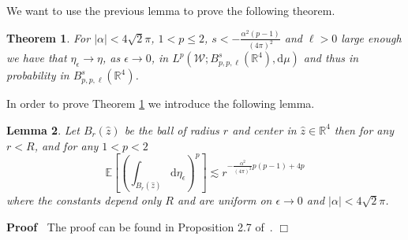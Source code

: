 \documentclass[a4paper,10pt]{article}
\newcommand{\mathd}{\mathrm{d}}
\newenvironment{proof}{\noindent\textbf{Proof\ }}{\hspace*{\fill}$\Box$\medskip}
\newtheorem{theorem}{Theorem}
\newtheorem{lemma}[theorem]{Lemma}
\begin{document}
We want to use the previous lemma to prove the following theorem.

\begin{theorem}
  \label{theorem_Lp}For $| \alpha | < 4 \sqrt{2} \pi$, $1 < p \leqslant 2$, $s
  < - \frac{\alpha^2 (p - 1)}{(4 \pi)^2}$ and $\ell > 0$ large enough we have
  that $\eta_{\epsilon} \rightarrow \eta$, as $\epsilon \rightarrow 0$, in
  $L^p (\mathcal{W} ; B^s_{p, p, \ell} (\mathbb{R}^4), \mathd \mu)$ and thus
  in probability in $B^s_{p, p, \ell} (\mathbb{R}^4)$.
\end{theorem}

In order to prove Theorem \ref{theorem_Lp} we introduce the following lemma.

\begin{lemma}
  \label{lemma_garban}Let $B_r (\hat{z})$ be the ball of radius $r$ and center
  in $\hat{z} \in \mathbb{R}^4$ then for any $r < R$, and for any $1 < p < 2$
  \[ \mathbb{E} \left[ \left( \int_{B_r (\hat{z})} \mathd \eta_{\epsilon}
     \right)^p \right] \lesssim r^{- \frac{\alpha^2}{(4 \pi)^2} p (p - 1) + 4
     p} \]
  where the constants depend only $R$ and are uniform on $\epsilon \rightarrow
  0$ and $| \alpha | < 4 \sqrt{2} \pi$.
\end{lemma}

\begin{proof}
  The proof can be found in Proposition 2.7 of~{\cite{Vargas2010}}.
\end{proof}
\end{document}
